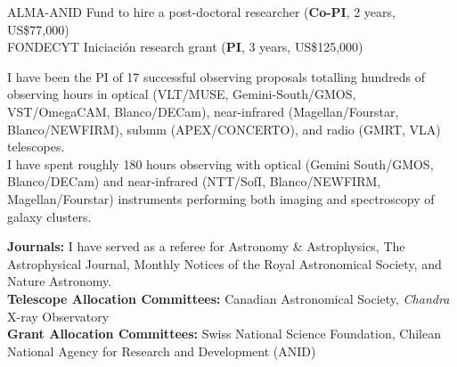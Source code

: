 \documentclass[11pt]{article}
\begin{document}
\hline



\noindent
{} ALMA-ANID Fund to hire a post-doctoral researcher (\textbf{Co-PI}, 2 years, US\$77,000)\\
 FONDECYT Iniciaci\'on research grant (\textbf{PI}, 3 years, US\$125,000)



%

\noindent
I have been the PI of 17 successful observing proposals totalling hundreds of 
observing hours in optical (VLT/MUSE, Gemini-South/GMOS, VST/OmegaCAM, Blanco/DECam), near-infrared 
(Magellan/Fourstar, Blanco/NEWFIRM), submm (APEX/CONCERTO), and radio (GMRT, VLA) telescopes.\\

{I have spent roughly 180 hours observing with 
optical (Gemini South/GMOS, Blanco/DECam) and near-infrared (NTT/SofI, Blanco/NEWFIRM, Magellan/Fourstar) instruments performing both imaging and spectroscopy of galaxy clusters.}


%


\noindent 
\textbf{Journals:} I have served as a referee for Astronomy \& Astrophysics, The 
    Astrophysical Journal, Monthly Notices of the Royal
    Astronomical Society, and Nature Astronomy.\\
\noindent
\textbf{Telescope Allocation Committees:}
Canadian Astronomical Society, \textit{Chandra} X-ray Observatory\\
\noindent
\textbf{Grant Allocation Committees:} Swiss National Science Foundation, Chilean National Agency for Research and Development (ANID)
\end{document}
